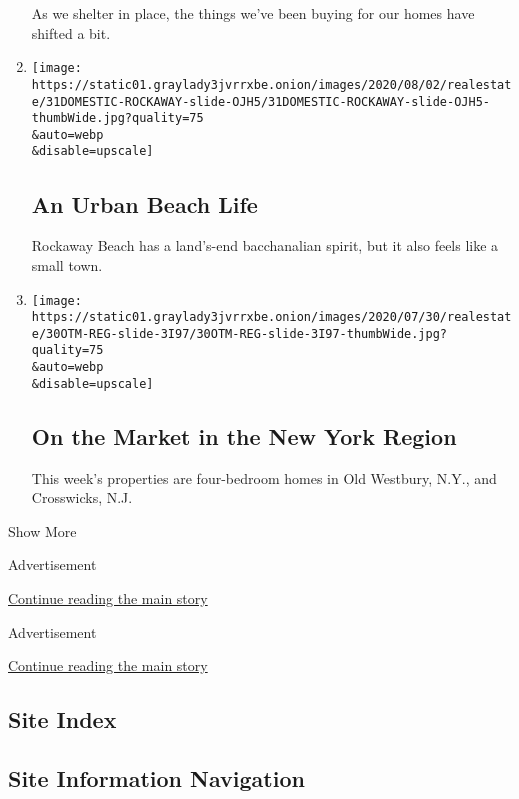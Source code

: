 \begin{enumerate}
  As we shelter in place, the things we've been buying for our homes
  have shifted a bit.
\item
  \href{/slideshow/2020/07/31/realestate/an-urban-beach-life.html}{}

  \texttt{[image: https://static01.graylady3jvrrxbe.onion/images/2020/08/02/realestate/31DOMESTIC-ROCKAWAY-slide-OJH5/31DOMESTIC-ROCKAWAY-slide-OJH5-thumbWide.jpg?quality=75\\\&auto=webp\\\&disable=upscale]}

  \hypertarget{an-urban-beach-life}{%
  \subsection{An Urban Beach Life}\label{an-urban-beach-life}}

  Rockaway Beach has a land's-end bacchanalian spirit, but it also feels
  like a small town.
\item
  \href{/slideshow/2020/07/30/realestate/on-the-market-in-the-new-york-region.html}{}

  \texttt{[image: https://static01.graylady3jvrrxbe.onion/images/2020/07/30/realestate/30OTM-REG-slide-3I97/30OTM-REG-slide-3I97-thumbWide.jpg?quality=75\\\&auto=webp\\\&disable=upscale]}

  \hypertarget{on-the-market-in-the-new-york-region}{%
  \subsection{On the Market in the New York
  Region}\label{on-the-market-in-the-new-york-region}}

  This week's properties are four-bedroom homes in Old Westbury, N.Y.,
  and Crosswicks, N.J.
\end{enumerate}

Show More

Advertisement

\protect\hyperlink{after-mid3}{Continue reading the main story}

Advertisement

\protect\hyperlink{after-mktg}{Continue reading the main story}

\hypertarget{site-index}{%
\subsection{Site Index}\label{site-index}}

\hypertarget{site-information-navigation}{%
\subsection{Site Information
Navigation}\label{site-information-navigation}}

